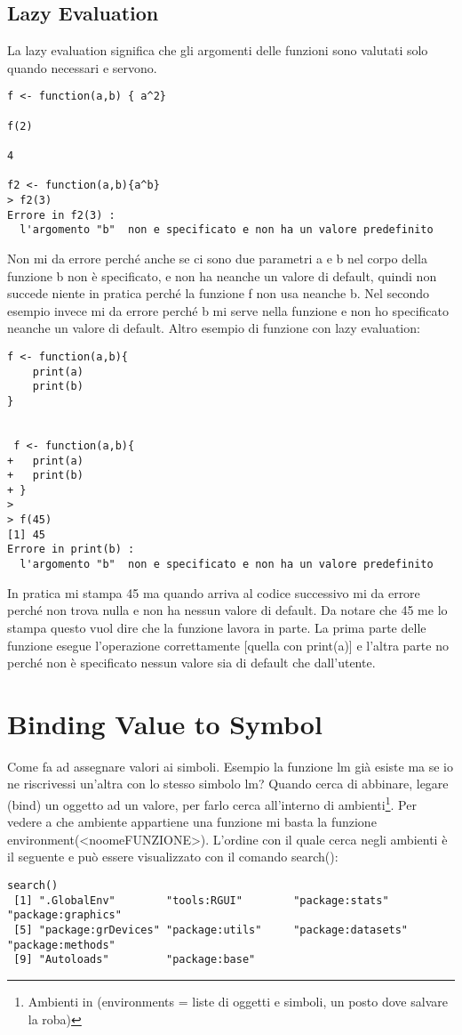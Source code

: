 \subsection{Lazy Evaluation}
La lazy evaluation significa che gli argomenti delle funzioni sono valutati
solo quando necessari e servono.
\begin{lstlisting}
f <- function(a,b) { a^2}

f(2)

4

f2 <- function(a,b){a^b}
> f2(3)
Errore in f2(3) : 
  l'argomento "b"  non e specificato e non ha un valore predefinito
\end{lstlisting}
Non mi da errore perché anche se ci sono due parametri a e b nel corpo della
funzione b non è specificato, e non ha neanche un valore di default, quindi non
succede niente in pratica perché la funzione f non usa neanche b.
Nel secondo esempio invece mi da errore perché b mi serve nella funzione e non ho specificato neanche un valore di default.
Altro esempio di funzione con lazy evaluation:
\begin{lstlisting}
f <- function(a,b){
	print(a)
	print(b)
}


 f <- function(a,b){
+ 	print(a)
+ 	print(b)
+ }
> 
> f(45)
[1] 45
Errore in print(b) : 
  l'argomento "b"  non e specificato e non ha un valore predefinito
\end{lstlisting}
In pratica mi stampa 45 ma quando arriva al codice successivo mi da errore perché non trova nulla e non ha nessun valore di default.
Da notare che 45 me lo stampa questo vuol dire che la funzione lavora in parte.
La prima parte delle funzione esegue l'operazione correttamente [quella con print(a)] e l'altra parte no perché non è specificato nessun valore sia di default che dall'utente.


\section{Binding Value to Symbol}

Come fa \erre ad assegnare valori ai simboli. Esempio la funzione lm già esiste
ma se io ne riscrivessi un'altra con lo stesso simbolo lm?
Quando \erre cerca di abbinare, legare (bind) un oggetto ad un valore, per farlo cerca all'interno di ambienti\footnote{Ambienti in \erre (environments  =  liste di oggetti e simboli, un posto dove salvare la roba)}.
Per vedere a che ambiente appartiene una funzione mi basta la funzione environment(<noomeFUNZIONE>).
L'ordine con il quale \erre cerca negli ambienti è il seguente e può essere
visualizzato con il comando search():
\begin{lstlisting}
search()
 [1] ".GlobalEnv"        "tools:RGUI"        "package:stats"     "package:graphics" 
 [5] "package:grDevices" "package:utils"     "package:datasets"  "package:methods"  
 [9] "Autoloads"         "package:base"     
\end{lstlisting}


